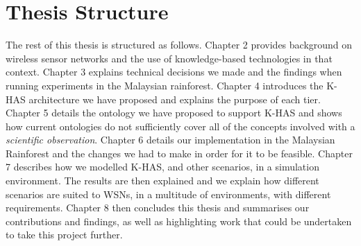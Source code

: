 \section{Thesis Structure}
The rest of this thesis is structured as follows. Chapter 2 provides background on wireless sensor networks and the use of knowledge-based technologies in that context. Chapter 3 explains technical decisions we made and the findings when running experiments in the Malaysian rainforest. Chapter 4 introduces the K-HAS architecture we have proposed and explains the purpose of each tier. Chapter 5 details the ontology we have proposed to support K-HAS and shows how current ontologies do not sufficiently cover all of the concepts involved with a \textit{scientific observation}. Chapter 6 details our implementation in the Malaysian Rainforest and the changes we had to make in order for it to be feasible. Chapter 7 describes how we modelled K-HAS, and other scenarios, in a simulation environment. The results are then explained and we explain how different scenarios are suited to WSNs, in a multitude of environments, with different requirements. Chapter 8 then concludes this thesis and summarises our contributions and findings, as well as highlighting work that could be undertaken to take this project further.
